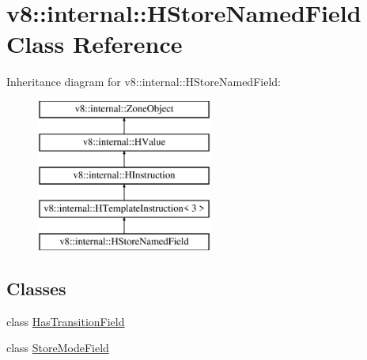 \hypertarget{classv8_1_1internal_1_1_h_store_named_field}{}\section{v8\+:\+:internal\+:\+:H\+Store\+Named\+Field Class Reference}
\label{classv8_1_1internal_1_1_h_store_named_field}
Inheritance diagram for v8\+:\+:internal\+:\+:H\+Store\+Named\+Field\+:\begin{figure}[H]
\begin{center}
\leavevmode
\includegraphics[height=5.000000cm]{classv8_1_1internal_1_1_h_store_named_field}
\end{center}
\end{figure}
\subsection*{Classes}
\begin{DoxyCompactItemize}
\item 
class \hyperlink{classv8_1_1internal_1_1_h_store_named_field_1_1_has_transition_field}{Has\+Transition\+Field}
\item 
class \hyperlink{classv8_1_1internal_1_1_h_store_named_field_1_1_store_mode_field}{Store\+Mode\+Field}
\end{DoxyCompactItemize}
